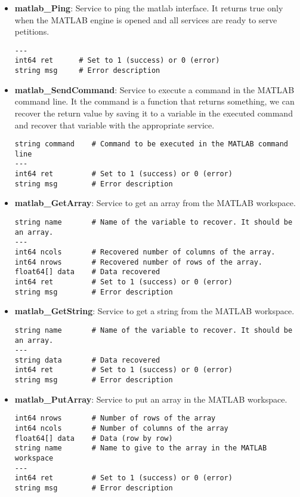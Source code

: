 \documentclass[letterpaper,notitlepage,11pt]{article}
\begin{document}
\begin{itemize}
\item \textbf{matlab\_Ping}: Service to ping the matlab interface. It
  returns true only when the MATLAB engine is opened and all services
  are ready to serve petitions.

\begin{verbatim}
---
int64 ret      # Set to 1 (success) or 0 (error)
string msg     # Error description
\end{verbatim}

\item \textbf{matlab\_SendCommand}: Service to execute a command in
  the MATLAB command line. It the command is a function that returns
  something, we can recover the return value by saving it to a variable
  in the executed command and recover that variable with the
  appropriate service.

\begin{verbatim}
string command    # Command to be executed in the MATLAB command line
---
int64 ret         # Set to 1 (success) or 0 (error)
string msg        # Error description
\end{verbatim}

\item \textbf{matlab\_GetArray}: Service to get an array from the
  MATLAB workspace.

\begin{verbatim}
string name       # Name of the variable to recover. It should be an array.
---
int64 ncols       # Recovered number of columns of the array.
int64 nrows       # Recovered number of rows of the array.
float64[] data    # Data recovered
int64 ret         # Set to 1 (success) or 0 (error)
string msg        # Error description
\end{verbatim}

\item \textbf{matlab\_GetString}: Service to get a string from the
  MATLAB workspace.

\begin{verbatim}
string name       # Name of the variable to recover. It should be an array.
---
string data       # Data recovered
int64 ret         # Set to 1 (success) or 0 (error)
string msg        # Error description
\end{verbatim}

\item \textbf{matlab\_PutArray}: Service to put an array in the
  MATLAB workspace.

\begin{verbatim}
int64 nrows 	  # Number of rows of the array
int64 ncols 	  # Number of columns of the array
float64[] data    # Data (row by row)
string name       # Name to give to the array in the MATLAB workspace
---
int64 ret         # Set to 1 (success) or 0 (error)
string msg        # Error description
\end{verbatim}


\end{itemize}
\end{document}
